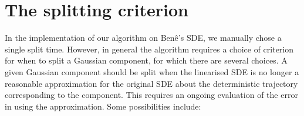 
\section{The splitting criterion}\label{sec:gmm_split_disc}
In the implementation of our algorithm on Ben\^e's SDE, we manually chose a single split time.
However, in general the algorithm requires a choice of criterion for when to split a Gaussian component, for which there are several choices.
A given Gaussian component should be split when the linearised SDE is no longer a reasonable approximation for the original SDE about the deterministic trajectory corresponding to the component.
This requires an ongoing evaluation of the error in using the approximation.
Some possibilities include:
